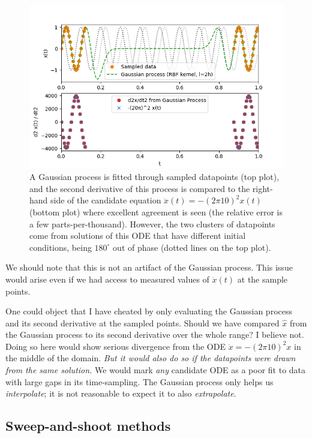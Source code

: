 \documentclass{article}
\begin{document}
\begin{figure}
\includegraphics{images/alternative_methods/gp_fitting.png}
\centering
\caption{A Gaussian process is fitted through sampled datapoints (top plot), and the second derivative of this process is compared to the right-hand side of the candidate equation $\ddot{x}(t) = -(2\pi10)^2 x(t)$ (bottom plot) where excellent agreement is seen (the relative error is a few parts-per-thousand).
However, the two clusters of datapoints come from solutions of this ODE that have different initial conditions, being $180^{\circ}$ out of phase (dotted lines on the top plot).
}
\label{fig:gp_fitting}
\end{figure}

We should note that this is not an artifact of the Gaussian process.
This issue would arise even if we had access to measured values of $\ddot{x}(t)$ at the sample points.

One could object that I have cheated by only evaluating the Gaussian process and its second derivative at the sampled points.
Should we have compared $\hat{x}$ from the Gaussian process to its second derivative over the whole range?
I believe not.
Doing so here would show serious divergence from the ODE $\ddot{x} = -(2\pi10)^2 x$ in the middle of the domain.
\emph{But it would also do so if the datapoints were drawn from the same solution.}
We would mark \emph{any} candidate ODE as a poor fit to data with large gaps in its time-sampling.
The Gaussian process only helps us \emph{interpolate}; it is not reasonable to expect it to also \emph{extrapolate}.

\subsection{Sweep-and-shoot methods}
\end{document}
